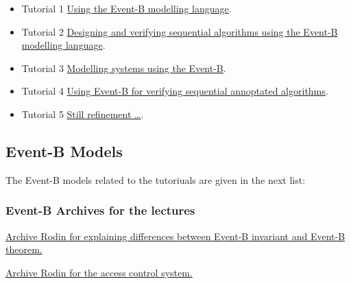 \documentclass[ 12pt]{article}
\begin{document}
  \begin{itemize}
  \item[]   Tutorial 1
    \href{http://mery54.github.io/teaching/mosos/lecturesnotes/master-tutorial1.pdf}{Using 
      the Event-B modelling language}.

     \item[]   Tutorial 2
    \href{http://mery54.github.io/teaching/mosos/lecturesnotes/master-tutorial2.pdf}{
      Designing and verifying sequential algorithms using the Event-B
      modelling language}.

        \item[]   Tutorial 3
    \href{http://mery54.github.io/teaching/mosos/lecturesnotes/master-tutorial3.pdf}{
      Modelling   systems  using the Event-B}.

   \item[]   Tutorial 4
    \href{http://mery54.github.io/teaching/mosos/lecturesnotes/master-tutorial4.pdf}{
      Using  Event-B  for  verifying sequential  annoptated algorithms}.


  
   \item[]   Tutorial 5
    \href{http://mery54.github.io/teaching/mosos/lecturesnotes/master-tutorial5.pdf}{
      Still refinement \ldots}.

  
    
  \end{itemize}



  \subsection{Event-B Models}
\label{sec:event-b-models}


The Event-B models related to the tutoriuals are given in the next list: 

\subsubsection{Event-B Archives for the  lectures}

 \href{http://mery54.github.io/teaching/mosos/lecturesnotes/
   ex-safety.zip}{Archive Rodin  for  explaining differences between
   Event-B invariant and Event-B theorem. }


 
 \href{http://mery54.github.io/teaching/mosos/models/
   ex0-accesscontrol.zip}{Archive Rodin  for   the access control system. }
  
\end{document}
